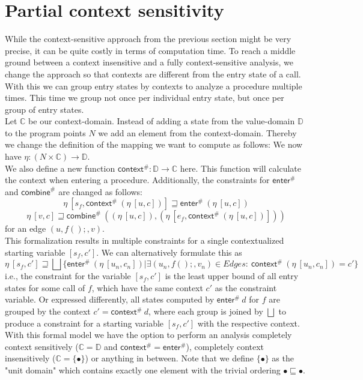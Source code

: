   \section{Partial context sensitivity}\label{section:partialCtxSens}
    While the context-sensitive approach from the previous section might be very precise, it can be quite costly in terms of computation time. To reach a middle ground between a context insensitive and a fully context-sensitive analysis, we change the approach so that contexts are different from the entry state of a call. With this we can group entry states by contexts to analyze a procedure multiple times. This time we group not once per individual entry state, but once per group of entry states.\\
    Let $\mathbb{C}$ be our context-domain. Instead of adding a state from the value-domain $\mathbb{D}$ to the program points $N$ we add an element from the context-domain. Thereby we change the definition of the mapping we want to compute as follows: We now have $\eta: (N \times \mathbb{C}) \rightarrow \mathbb{D}$.\\
    We also define a new function $\textsf{context}^{\#}: \mathbb{D} \rightarrow \mathbb{C}$ here. This function will calculate the context when entering a procedure. Additionally, the constraints for $\textsf{enter}^{\#}$ and $\textsf{combine}^{\#}$ are changed as follows:
    \[\eta\ [s_f, \textsf{context}^{\#}\ (\eta\ [u, c])] \sqsupseteq \textsf{enter}^{\#}\ (\eta\ [u, c]) \]
    \[\eta\ [v, c] \sqsupseteq \textsf{combine}^{\#}\ ((\eta\ [u, c]), (\eta\ [e_f, \textsf{context}^{\#}\ (\eta\ [u, c])])) \]
    for an edge $(u, f();, v)$.\\
    This formalization results in multiple constraints for a single contextualized starting variable $[s_f, c']$. We can alternatively formulate this as
    \[\eta\ [s_f, c'] \sqsupseteq \bigsqcup \{\textsf{enter}^{\#}\ (\eta\ [u_n, c_n]) | \exists (u_n, f();, v_n) \in Edges:\ \textsf{context}^{\#}\ (\eta\ [u_n, c_n]) = c' \} \]
    i.e., the constraint for the variable $[s_f, c']$ is the least upper bound of all entry states for some call of $f$, which have the same context $c'$ as the constraint variable. Or expressed differently, all states computed by $\textsf{enter}^{\#}\ d$ for $f$ are grouped by the context $c' = \textsf{context}^{\#}\ d$, where each group is joined by $\bigsqcup$ to produce a constraint for a starting variable $[s_f, c']$ with the respective context.\\ 
    With this formal model we have the option to perform an analysis completely context sensitively ($\mathbb{C} = \mathbb{D}$ and $\textsf{context}^{\#} = \textsf{enter}^{\#}$), completely context insensitively ($\mathbb{C} = \{\bullet\}$) or anything in between. Note that we define $\{\bullet\}$ as the "unit domain" which contains exactly one element with the trivial ordering $\bullet \sqsubseteq \bullet$.\\
